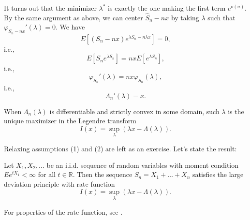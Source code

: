 It turns out that the minimizer $\lambda^*$ is exactly the one making the first term $e^{o(n)}$. By the same argument as above, we can center $\hat S_n - n x$ by taking $\lambda$ such that $\varphi_{S_n - n x}'(\lambda) = 0$. 
We have
\[
    E [ (S_n - n x) e^{\lambda S_n - n \lambda x} ] = 0
,\]
i.e., 
\[
    E [S_n e^{\lambda S_n} ] = n x E [ e^{\lambda S_n} ],
\]
i.e.,
\[
    \varphi_{S_n}'(\lambda) = n x \varphi_{S_n}(\lambda),
\]
i.e.,
\[
    \Lambda_n'(\lambda) = x.
\]

When $\Lambda_n(\lambda)$ is differentiable and strictly convex in some domain, such $\lambda$ is the unique maximizer in the Legendre transform
\[
    I(x) = \sup_{\lambda} \left( \lambda x - \Lambda(\lambda) \right).
\]

Relaxing assumptions (1) and (2) are left as an exercise. Let's state the result:

\begin{theorem}
    Let $X_1, X_2, \ldots$ be an i.i.d. sequence of random variables with moment condition $E e^{t X_1} < \infty$ for all $t \in \mathbb{R}$. Then the sequence $S_n = X_1 + \ldots + X_n$ satisfies the large deviation principle with rate function
    \[
        I(x) = \sup_{\lambda} \left( \lambda x - \Lambda(\lambda) \right).
    \]
\end{theorem}

For properties of the rate function, see \autocite[Lemma~I.14]{denhollanderLargeDeviations2008}. 